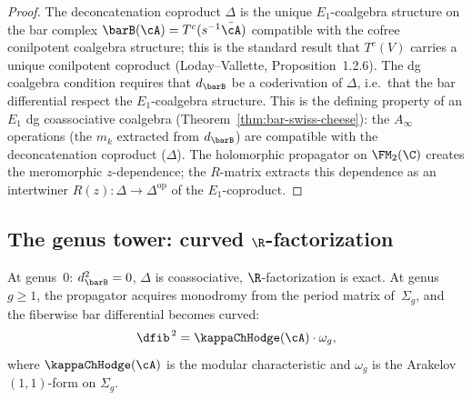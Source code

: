 \begin{proof}
The deconcatenation coproduct $\Delta$ is the unique
$E_1$-coalgebra structure on the bar complex
$\barB(\cA) = T^c(s^{-1}\bar{\cA})$ compatible with the
cofree conilpotent coalgebra structure; this is the standard
result that $T^c(V)$ carries a unique conilpotent coproduct
(Loday--Vallette, Proposition~1.2.6). The
dg coalgebra condition requires that $d_{\barB}$
be a coderivation of $\Delta$, i.e.\ that the bar differential
respect the $E_1$-coalgebra structure. This is the defining
property of an $E_1$ dg coassociative coalgebra
(Theorem~\ref{thm:bar-swiss-cheese}): the $A_\infty$ operations
(the $m_k$ extracted from $d_{\barB}$) are compatible with
the deconcatenation coproduct ($\Delta$). The holomorphic propagator on
$\FM_2(\C)$ creates the meromorphic $z$-dependence; the
$R$-matrix extracts this dependence as an intertwiner
$R(z) \colon \Delta \to \Delta^{\mathrm{op}}$ of the
$E_1$-coproduct.
\end{proof}

\subsection{The genus tower: curved $\R$-factorization}
\label{subsec:genus-tower-R}

At genus~$0$: $d_{\barB}^2 = 0$, $\Delta$ is
coassociative, $\R$-factorization is exact. At genus $g \geq 1$,
the propagator acquires monodromy from the period matrix
of~$\Sigma_g$, and the fiberwise bar differential becomes curved:
\begin{equation}\label{eq:curved-R-fact}
\dfib^{\,2} = \kappaChHodge(\cA) \cdot \omega_g,
\end{equation}
where $\kappaChHodge(\cA)$ is the modular characteristic and $\omega_g$ is
the Arakelov $(1,1)$-form on $\Sigma_g$.

